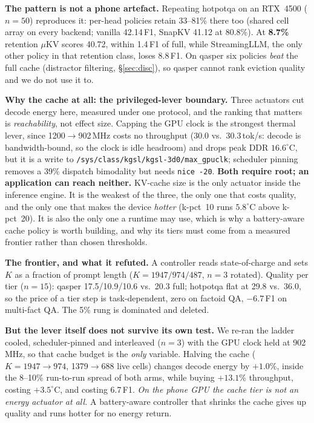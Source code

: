 \documentclass[sigconf,10pt]{acmart}
\begin{document}
\textbf{The pattern is not a phone artefact.} Repeating hotpotqa on an RTX~4500 ($n{=}50$) reproduces it: per-head policies retain 33--81\% there too (shared cell array on every backend; vanilla 42.14\,F1, SnapKV 41.12 at 80.8\%). At \textbf{8.7\%} retention $\mu$KV scores 40.72, within 1.4\,F1 of full, while StreamingLLM, the only other policy in that retention class, loses 8.8\,F1. On qasper six policies \emph{beat} the full cache (distractor filtering, \S\ref{sec:disc}), so qasper cannot rank eviction quality and we do not use it to.

\textbf{Why the cache at all: the privileged-lever boundary.} Three actuators cut decode energy here, measured under one protocol, and the ranking that matters is \emph{reachability}, not effect size. Capping the GPU clock is the strongest thermal lever, since 1200$\to$902\,MHz costs no throughput (30.0 vs.\ 30.3\,tok/s: decode is bandwidth-bound, so the clock is idle headroom) and drops peak DDR $16.6^\circ$C, but it is a write to \texttt{/sys/class/kgsl/\allowbreak kgsl-3d0/max\_gpuclk}; scheduler pinning removes a 39\% dispatch bimodality but needs \texttt{nice -20}. \textbf{Both require root; an application can reach neither.} KV-cache size is the only actuator inside the inference engine. It is the weakest of the three, the only one that costs quality, and the only one that makes the device \emph{hotter} (k-pct~10 runs $5.8^\circ$C above k-pct~20). It is also the only one a runtime may use, which is why a battery-aware cache policy is worth building, and why its tiers must come from a measured frontier rather than chosen thresholds.

\textbf{The frontier, and what it refuted.} A controller reads state-of-charge and sets $K$ as a fraction of prompt length ($K{=}1947/974/487$, $n{=}3$ rotated). Quality per tier ($n{=}15$): qasper 17.5/10.9/10.6 vs.\ 20.3 full; hotpotqa flat at 29.8 vs.\ 36.0, so the price of a tier step is task-dependent, zero on factoid QA, $-6.7$\,F1 on multi-fact QA. The 5\% rung is dominated and deleted. 

\textbf{But the lever itself does not survive its own test.} We re-ran the ladder cooled, scheduler-pinned and interleaved ($n{=}3$) with the GPU clock held at 902\,MHz, so that cache budget is the \emph{only} variable. Halving the cache ($K{=}1947\!\rightarrow\!974$, 1379$\rightarrow$688 live cells) changes decode energy by $\mathbf{+1.0\%}$, inside the 8--10\% run-to-run spread of both arms, while buying $+13.1$\% throughput, costing $+3.5^\circ$C, and costing 6.7\,F1. \emph{On the phone GPU the cache tier is not an energy actuator at all.} A battery-aware controller that shrinks the cache gives up quality and runs hotter for no energy return. 
\end{document}
